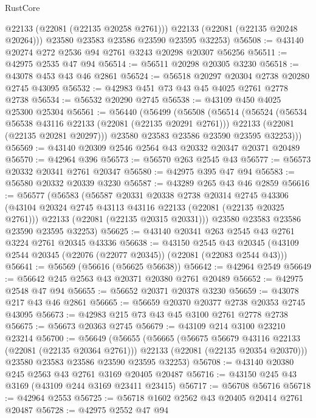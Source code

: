 \begin{lexlean}{RustCore}
\begin{coremodule}
          @22133
          (@22081 (@22135 @20258 @2761)))
        @22133
        (@22081 (@22135 @20248 @20264)))
      @23580
      @23583
      @23586
      @23590
      @23595
      @32253)
@56508 := @43140 @20274 @272 @2536 @94 @2761 @3243 @20298 @20307 @56256
@56511 := @42975 @2535 @47 @94
@56514 := @56511 @20298 @20305 @3230
@56518 := @43078 @453 @43 @46 @2861
@56524 := @56518 @20297 @20304 @2738 @20280 @2745 @43095
@56532 := @42983 @451 @73 @43 @45 @4025 @2761 @2778 @2738
@56534 := @56532 @20290 @2745
@56538 := @43109 @450 @4025 @25300 @25304
@56561 := @56440
    (@56499
      (@56508
        (@56514
          (@56524
            (@56534 @56538 @43116 @22133 (@22081 (@22135 @20291 @2761)))
            @22133
            (@22081 (@22135 @20281 @20297)))
          @23580
          @23583
          @23586
          @23590
          @23595
          @32253)))
@56569 := @43140 @20309 @2546 @2564 @43 @20332 @20347 @20371 @20489
@56570 := @42964 @396
@56573 := @56570 @263 @2545 @43
@56577 := @56573 @20332 @20341 @2761 @20347
@56580 := @42975 @395 @47 @94
@56583 := @56580 @20332 @20339 @3230
@56587 := @43289 @265 @43 @46 @2859
@56616 := @56577
    (@56583
      (@56587
        @20331
        @20338
        @2738
        @20314
        @2745
        @43306
        (@43104 @20324 @2745 @43113 @43116 @22133 (@22081 (@22135 @20325 @2761)))
        @22133
        (@22081 (@22135 @20315 @20331)))
      @23580
      @23583
      @23586
      @23590
      @23595
      @32253)
@56625 := @43140 @20341 @263 @2545 @43 @2761 @3224 @2761 @20345 @43336
@56638 := @43150
    @2545
    @43
    @20345
    (@43109 @2544 @20345 (@22076 (@22077 @20345)) (@22081 (@22083 @2544 @43)))
@56641 := @56569 (@56616 (@56625 @56638))
@56642 := @42964 @2549
@56649 := @56642 @245 @2563 @43 @20371 @20380 @2761 @20489
@56652 := @42975 @2548 @47 @94
@56655 := @56652 @20371 @20378 @3230
@56659 := @43078 @217 @43 @46 @2861
@56665 := @56659 @20370 @20377 @2738 @20353 @2745 @43095
@56673 := @42983 @215 @73 @43 @45 @3100 @2761 @2778 @2738
@56675 := @56673 @20363 @2745
@56679 := @43109 @214 @3100 @23210 @23214
@56700 := @56649
    (@56655
      (@56665
        (@56675 @56679 @43116 @22133 (@22081 (@22135 @20364 @2761)))
        @22133
        (@22081 (@22135 @20354 @20370)))
      @23580
      @23583
      @23586
      @23590
      @23595
      @32253)
@56708 := @43140 @20380 @245 @2563 @43 @2761 @3169 @20405 @20487
@56716 := @43150 @245 @43 @3169 (@43109 @244 @3169 @23411 @23415)
@56717 := @56708 @56716
@56718 := @42964 @2553
@56725 := @56718 @1602 @2562 @43 @20405 @20414 @2761 @20487
@56728 := @42975 @2552 @47 @94

\end{coremodule}
\end{lexlean}

